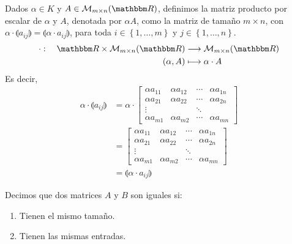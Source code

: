 \begin{definition}
    Dados $\alpha \in K$ y $A \in \matrizmn$, definimos la matriz producto por escalar de $\alpha$ y $A$, denotada por $\alpha A$, como la matriz de tamaño $m \times n$, con $\alpha \cdot \llparenthesis a_{ij} \rrparenthesis = \llparenthesis \alpha \cdot a_{ij} \rrparenthesis$, para toda $i \in \left\lbrace 1, \dots, m \right\rbrace$ y $j \in \left\lbrace 1, \dots, n \right\rbrace$.
    \begin{align*}
        \cdot : \quad \RR \times \matrizmn & \longrightarrow \matrizmn \\
        (\alpha, A ) & \longmapsto \alpha \cdot A
    \end{align*}
    Es decir,
    \begin{align*}
        \alpha \cdot \llparenthesis a_{ij} \rrparenthesis & = \alpha \cdot \begin{bmatrix}
        \alpha a_{11} & \alpha a_{12} & \cdots & \alpha a_{1n}\\
        \alpha a_{21} & \alpha a_{22} & \cdots & \alpha a_{2n}\\
        \vdots &  & \ddots & \\
        \alpha a_{m1} & \alpha a_{m2} & \cdots & \alpha a_{mn}
    \end{bmatrix} \\
    & = \begin{bmatrix}
        \alpha a_{11} & \alpha a_{12} & \cdots & \alpha a_{1n}\\
        \alpha a_{21} & \alpha a_{22} & \cdots & \alpha a_{2n}\\
        \vdots &  & \ddots & \\
        \alpha a_{m1} & \alpha a_{m2} & \cdots & \alpha a_{mn}
    \end{bmatrix} \\
    & = \llparenthesis \alpha \cdot a_{ij} \rrparenthesis
    \end{align*}
\end{definition}

\begin{definition}
    Decimos que dos matrices $A$ y $B$ son iguales si:
    \begin{enumerate}[label=\roman*)]
        \item Tienen el mismo tamaño.
        \item Tienen las mismas entradas.
    \end{enumerate}
\end{definition}

